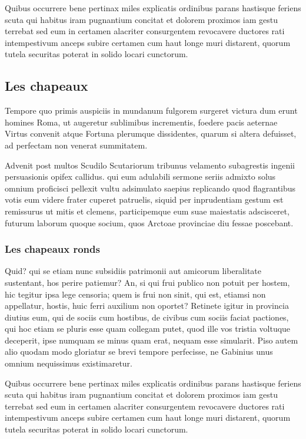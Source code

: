 \documentclass{framatexclass}
\begin{document}
Quibus occurrere bene pertinax miles explicatis ordinibus parans hastisque feriens scuta qui habitus iram pugnantium concitat et dolorem proximos iam gestu terrebat sed eum in certamen alacriter consurgentem revocavere ductores rati intempestivum anceps subire certamen cum haut longe muri distarent, quorum tutela securitas poterat in solido locari cunctorum.


\subsection{Les chapeaux}
Tempore quo primis auspiciis in mundanum fulgorem surgeret victura dum erunt homines Roma, ut augeretur sublimibus incrementis, foedere pacis aeternae Virtus convenit atque Fortuna plerumque dissidentes, quarum si altera defuisset, ad perfectam non venerat summitatem.

Advenit post multos Scudilo Scutariorum tribunus velamento subagrestis ingenii persuasionis opifex callidus. qui eum adulabili sermone seriis admixto solus omnium proficisci pellexit vultu adsimulato saepius replicando quod flagrantibus votis eum videre frater cuperet patruelis, siquid per inprudentiam gestum est remissurus ut mitis et clemens, participemque eum suae maiestatis adscisceret, futurum laborum quoque socium, quos Arctoae provinciae diu fessae poscebant.


\subsubsection{Les chapeaux ronds}
Quid? qui se etiam nunc subsidiis patrimonii aut amicorum liberalitate sustentant, hos perire patiemur? An, si qui frui publico non potuit per hostem, hic tegitur ipsa lege censoria; quem is frui non sinit, qui est, etiamsi non appellatur, hostis, huic ferri auxilium non oportet? Retinete igitur in provincia diutius eum, qui de sociis cum hostibus, de civibus cum sociis faciat pactiones, qui hoc etiam se pluris esse quam collegam putet, quod ille vos tristia voltuque deceperit, ipse numquam se minus quam erat, nequam esse simularit. Piso autem alio quodam modo gloriatur se brevi tempore perfecisse, ne Gabinius unus omnium nequissimus existimaretur.

Quibus occurrere bene pertinax miles explicatis ordinibus parans hastisque feriens scuta qui habitus iram pugnantium concitat et dolorem proximos iam gestu terrebat sed eum in certamen alacriter consurgentem revocavere ductores rati intempestivum anceps subire certamen cum haut longe muri distarent, quorum tutela securitas poterat in solido locari cunctorum.
\end{document}
